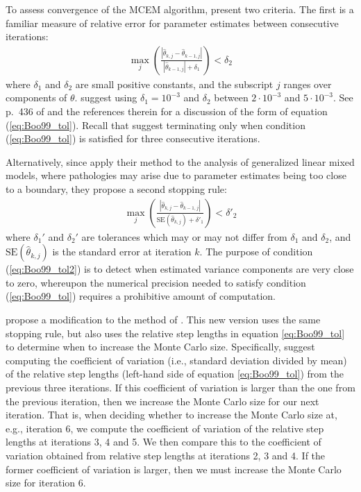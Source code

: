 \documentclass[ss]{imsart}
\theoremstyle{plain}
\theoremstyle{definition}
\theoremstyle{remark}
\begin{document}
To assess convergence of the MCEM algorithm, \citeauthor{Boo99} present two criteria. The first is a familiar measure of relative error for parameter estimates between consecutive iterations:
%
\begin{align}
    \max_j \left( \frac{\left| \hat{\theta}_{k, j} - \hat{\theta}_{k-1,j} \right|}{\left| \hat{\theta}_{k-1,j} \right| + \delta_1} \right) < \delta_2 \label{eq:Boo99_tol}
\end{align}
%
where $\delta_1$ and $\delta_2$ are small positive constants, and the subscript $j$ ranges over components of $\theta$. \citeauthor{Boo99} suggest using $\delta_1 = 10^{-3}$ and $\delta_2$ between $2 \cdot 10^{-3}$ and $5 \cdot 10^{-3}$. See p.\ 436 of \citet{Sea06} and the references therein for a discussion of the form of equation (\ref{eq:Boo99_tol}). Recall that \citeauthor{Boo99} suggest terminating only when condition (\ref{eq:Boo99_tol}) is satisfied for three consecutive iterations.

Alternatively, since \citeauthor{Boo99} apply their method to the analysis of generalized linear mixed models, where pathologies may arise due to parameter estimates being too close to a boundary, they propose a second stopping rule:
%
\begin{align}
    \max_j \left( \frac{\left| \hat{\theta}_{k, j} - \hat{\theta}_{k-1,j} \right|}{\mathrm{SE}\left(\hat{\theta}_{k,j}\right) + \delta'_1} \right) < \delta'_2 \label{eq:Boo99_tol2}
\end{align}
%
where $\delta_1'$ and $\delta_2'$ are tolerances which may or may not differ from $\delta_1$ and $\delta_2$, and $\mathrm{SE}\left(\hat{\theta}_{k,j}\right)$ is the standard error at iteration $k$. The purpose of condition (\ref{eq:Boo99_tol2}) is to detect when estimated variance components are very close to zero, whereupon the numerical precision needed to satisfy condition (\ref{eq:Boo99_tol}) requires a prohibitive amount of computation.

\citet{Rip02} propose a modification to the method of \citeauthor{Boo99}. This new version uses the same stopping rule, but also uses the relative step lengths in equation \ref{eq:Boo99_tol} to determine when to increase the Monte Carlo size. Specifically, \citeauthor{Rip02} suggest computing the coefficient of variation (i.e., standard deviation divided by mean) of the relative step lengths (left-hand side of equation \ref{eq:Boo99_tol}) from the previous three iterations. If this coefficient of variation is larger than the one from the previous iteration, then we increase the Monte Carlo size for our next iteration. That is, when deciding whether to increase the Monte Carlo size at, e.g., iteration 6, we compute the coefficient of variation of the relative step lengths at iterations 3, 4 and 5. We then compare this to the coefficient of variation obtained from relative step lengths at iterations 2, 3 and 4. If the former coefficient of variation is larger, then we must increase the Monte Carlo size for iteration 6.
\end{document}
